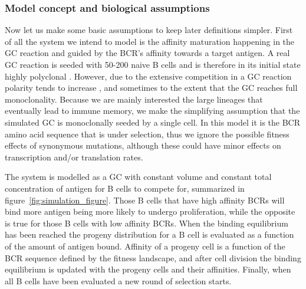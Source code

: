 \subsubsection{Model concept and biological assumptions}
Now let us make some basic assumptions to keep later definitions simpler.
First of all the system we intend to model is the affinity maturation happening in the GC reaction and guided by the BCR's affinity towards a target antigen.
A real GC reaction is seeded with 50-200 naive B cells and is therefore in its initial state highly polyclonal \cite{tas2016visualizing}.
However, due to the extensive competition in a GC reaction polarity tends to increase \cite{tas2016visualizing}, and sometimes to the extent that the GC reaches full monoclonality.
Because we are mainly interested the large lineages that eventually lead to immune memory, we make the simplifying assumption that the simulated GC is monoclonally seeded by a single cell.
In this model it is the BCR amino acid sequence that is under selection, thus we ignore the possible fitness effects of synonymous mutations, although these could have minor effects on transcription and/or translation rates.

The system is modelled as a GC with constant volume and constant total concentration of antigen for B cells to compete for, summarized in figure~\ref{fig:simulation_figure}.
Those B cells that have high affinity BCRs will bind more antigen being more likely to undergo proliferation, while the opposite is true for those B cells with low affinity BCRs.
When the binding equilibrium has been reached the progeny distribution for a B cell is evaluated as a function of the amount of antigen bound.
Affinity of a progeny cell is a function of the BCR sequence defined by the fitness landscape, and after cell division the binding equilibrium is updated with the progeny cells and their affinities.
Finally, when all B cells have been evaluated a new round of selection starts.


